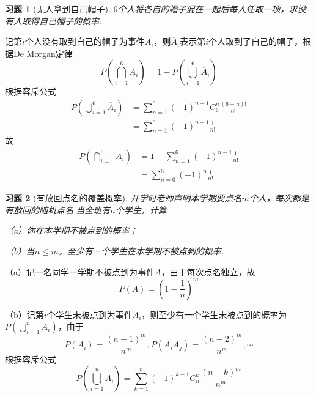 \documentclass[UTF8,12pt,a4paper,fontset=fandol]{ctexart}
\newtheorem{exercise}{习题}[section]
\begin{document}
\begin{exercise}[无人拿到自己帽子]\label{q:Y2.3}
$6$个人将各自的帽子混在一起后每人任取一项，求没有人取得自己帽子的概率.\par{}
\end{exercise}

\begin{solve}\label{a:Y2.3}
记第$i$个人没有取到自己的帽子为事件$A_i$，则$\overline{A}_i$表示第$i$个人取到了自己的帽子，根据De Morgan定律
\[P(\bigcap\limits_{i = 1}^6 {{A_i}} ) = 1 - P(\bigcup\limits_{i = 1}^6 {{{\overline A }_i}} )\]
根据容斥公式
\[\begin{aligned}P(\bigcup\limits_{i = 1}^6 {{{\overline A }_i}} ) &= \sum\limits_{n = 1}^6 {{{( - 1)}^{n - 1}}C_6^n\frac{{(6 - n)!}}{{6!}}}  \\&= \sum\limits_{n = 1}^6 {{{( - 1)}^{n - 1}}\frac{1}{{n!}}} \end{aligned}\]
故
\[\begin{aligned}P(\bigcap\limits_{i = 1}^6 {{A_i}} ) &= 1 - \sum\limits_{n = 1}^6 {{{( - 1)}^{n - 1}}\frac{1}{{n!}}}  \\&= \sum\limits_{n = 0}^6 {{{( - 1)}^n}\frac{1}{{n!}}} \end{aligned}\]
\end{solve}

\begin{exercise}[有放回点名的覆盖概率]\label{q:Y2.4}
开学时老师声明本学期要点名$m$个人，每次都是有放回的随机点名.当全班有$n$个学生，计算

（a）你在本学期不被点到的概率；

（b）当$n\leqslant m$，至少有一个学生在本学期不被点到的概率.\par{}
\end{exercise}

\begin{solve}\label{a:Y2.4}
（a）记一名同学一学期不被点到为事件$A$，由于每次点名独立，故
\[P(A) = {\left( {1 - \frac{1}{n}} \right)^m}\]

（b）记第$i$个学生未被点到为事件$A_i$，则至少有一个学生未被点到的概率为$P(\bigcup\limits_{i = 1}^n {{A_i}})$，由于\[P({A_i}) = \frac{{{{(n - 1)}^m}}}{{{n^m}}},P({A_i}{A_j}) = \frac{{{{(n - 2)}^m}}}{{{n^m}}}, \cdots \]根据容斥公式
\[P(\bigcup\limits_{i = 1}^n {{A_i}} ) = \sum\limits_{k = 1}^n {{{( - 1)}^{k - 1}}} C_n^k\frac{{{{(n - k)}^m}}}{{{n^m}}}\]
\end{solve}
\end{document}
